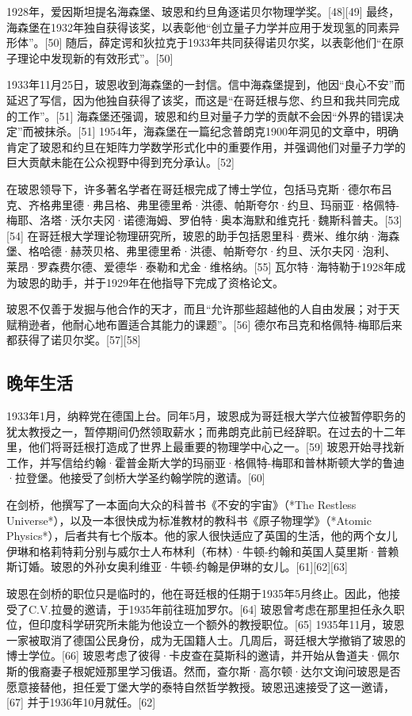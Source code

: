 1928年，爱因斯坦提名海森堡、玻恩和约旦角逐诺贝尔物理学奖。[48][49] 最终，海森堡在1932年独自获得该奖，以表彰他“创立量子力学并应用于发现氢的同素异形体”。[50] 随后，薛定谔和狄拉克于1933年共同获得诺贝尔奖，以表彰他们“在原子理论中发现新的有效形式”。[50]

1933年11月25日，玻恩收到海森堡的一封信。信中海森堡提到，他因“良心不安”而延迟了写信，因为他独自获得了该奖，而这是“在哥廷根与您、约旦和我共同完成的工作”。[51] 海森堡还强调，玻恩和约旦对量子力学的贡献不会因“外界的错误决定”而被抹杀。[51] 1954年，海森堡在一篇纪念普朗克1900年洞见的文章中，明确肯定了玻恩和约旦在矩阵力学数学形式化中的重要作用，并强调他们对量子力学的巨大贡献未能在公众视野中得到充分承认。[52]

在玻恩领导下，许多著名学者在哥廷根完成了博士学位，包括马克斯·德尔布吕克、齐格弗里德·弗吕格、弗里德里希·洪德、帕斯夸尔·约旦、玛丽亚·格佩特-梅耶、洛塔·沃尔夫冈·诺德海姆、罗伯特·奥本海默和维克托·魏斯科普夫。[53][54] 在哥廷根大学理论物理研究所，玻恩的助手包括恩里科·费米、维尔纳·海森堡、格哈德·赫茨贝格、弗里德里希·洪德、帕斯夸尔·约旦、沃尔夫冈·泡利、莱昂·罗森费尔德、爱德华·泰勒和尤金·维格纳。[55] 瓦尔特·海特勒于1928年成为玻恩的助手，并于1929年在他指导下完成了资格论文。

玻恩不仅善于发掘与他合作的天才，而且“允许那些超越他的人自由发展；对于天赋稍逊者，他耐心地布置适合其能力的课题”。[56] 德尔布吕克和格佩特-梅耶后来都获得了诺贝尔奖。[57][58]
\subsection{晚年生活}
1933年1月，纳粹党在德国上台。同年5月，玻恩成为哥廷根大学六位被暂停职务的犹太教授之一，暂停期间仍然领取薪水；而弗朗克此前已经辞职。在过去的十二年里，他们将哥廷根打造成了世界上最重要的物理学中心之一。[59] 玻恩开始寻找新工作，并写信给约翰·霍普金斯大学的玛丽亚·格佩特-梅耶和普林斯顿大学的鲁迪·拉登堡。他接受了剑桥大学圣约翰学院的邀请。[60] 

在剑桥，他撰写了一本面向大众的科普书《不安的宇宙》（*The Restless Universe*），以及一本很快成为标准教材的教科书《原子物理学》（*Atomic Physics*），后者共有七个版本。他的家人很快适应了英国的生活，他的两个女儿伊琳和格莉特莉分别与威尔士人布林利（布林）·牛顿-约翰和英国人莫里斯·普赖斯订婚。玻恩的外孙女奥利维亚·牛顿-约翰是伊琳的女儿。[61][62][63]

玻恩在剑桥的职位只是临时的，他在哥廷根的任期于1935年5月终止。因此，他接受了C.V.拉曼的邀请，于1935年前往班加罗尔。[64] 玻恩曾考虑在那里担任永久职位，但印度科学研究所未能为他设立一个额外的教授职位。[65] 1935年11月，玻恩一家被取消了德国公民身份，成为无国籍人士。几周后，哥廷根大学撤销了玻恩的博士学位。[66] 玻恩考虑了彼得·卡皮查在莫斯科的邀请，并开始从鲁道夫·佩尔斯的俄裔妻子根妮娅那里学习俄语。然而，查尔斯·高尔顿·达尔文询问玻恩是否愿意接替他，担任爱丁堡大学的泰特自然哲学教授。玻恩迅速接受了这一邀请，[67] 并于1936年10月就任。[62]

